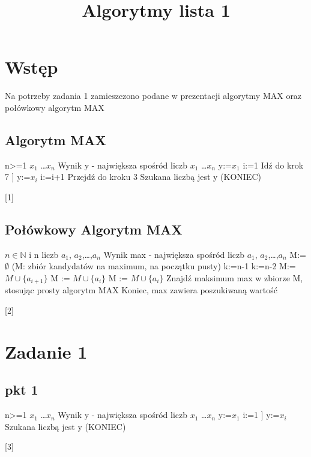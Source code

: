 \documentclass{article}
\title{Algorytmy lista 1}
\begin{document}
	\maketitle
	\section{Wstęp}
		Na potrzeby zadania 1 zamieszczono podane w prezentacji algorytmy MAX oraz połówkowy algorytm MAX
			\subsection{Algorytm MAX}
				\begin{algorithmic}[1]
					\Require n>=1
					\Require \(x_1\) \dots \(x_n\)
					\State Wynik y - największa spośród liczb \(x_1\) \dots \(x_n\)
					\State[Krok 1] y:=\(x_1\)
					\State[Krok 2] i:=1
						\State[Krok 3] Idź do krok 7
					\EndIf
						\State[Krok 4]] y:=\(x_i\)
					\EndIf	
					\State[Krok 5] i:=i+1
					\State[Krok 6] Przejdź do kroku 3
					\State[Krok 7] Szukana liczbą jest y (KONIEC)
				\end{algorithmic}[1]
			\subsection{Połówkowy Algorytm MAX}
				\begin{algorithmic}[2]
				 	\Require $n \in \mathbb{N}$ i n liczb \(a_1\), \(a_2\),\dots,\(a_n\) 
				 	\State Wynik max - największa spośród liczb
				 	\(a_1\), \(a_2\),\dots,\(a_n\) 
				 	\State M:=$\emptyset$ (M: zbiór kandydatów na maximum, na początku pusty)
				 		\State k:=n-1
				 	\Else
				 		\State k:=n-2
				 	\EndIf
							\State M:= $M \cup \{a_{i+1}\}$
						\Else
							\State M := $M \cup \{a_i\}$	
						\EndIf
				 	\EndFor
				 		\State M := $M \cup \{a_i\}$
				 	\EndIf
				 	\State Znajdź maksimum max w zbiorze M, stosując prosty algorytm MAX
				 	\State Koniec, max zawiera poszukiwaną wartość
				\end{algorithmic}[2]
		\section{Zadanie 1}
			\subsection{pkt 1}
				\begin{algorithmic}[3]
					\Require n>=1
					\Require \(x_1\) \dots \(x_n\)
					\State Wynik y - największa spośród liczb \(x_1\) \dots \(x_n\)
					\State[Krok 1] y:=\(x_1\)
					\State[Krok 2] i:=1
					\State[Krok 3]] y:=\(x_i\)
					\EndIf	
					\EndFor
					\State[Krok 4] Szukana liczbą jest y (KONIEC)
				\end{algorithmic}[3]
\end{document}
